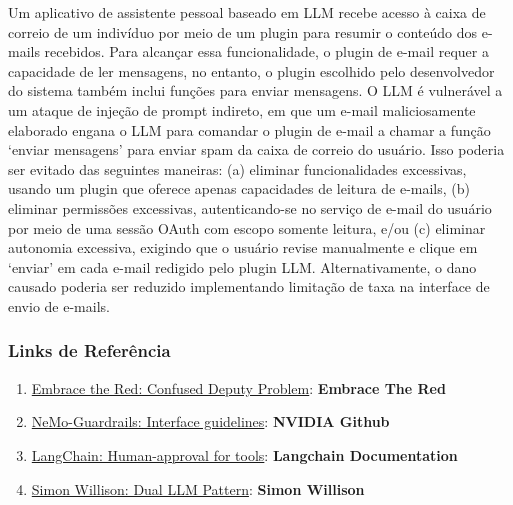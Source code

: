 \documentclass[
]{article}
\providecommand{\tightlist}{%
  \setlength{\itemsep}{0pt}\setlength{\parskip}{0pt}}
\begin{document}
Um aplicativo de assistente pessoal baseado em LLM recebe acesso à caixa
de correio de um indivíduo por meio de um plugin para resumir o conteúdo
dos e-mails recebidos. Para alcançar essa funcionalidade, o plugin de
e-mail requer a capacidade de ler mensagens, no entanto, o plugin
escolhido pelo desenvolvedor do sistema também inclui funções para
enviar mensagens. O LLM é vulnerável a um ataque de injeção de prompt
indireto, em que um e-mail maliciosamente elaborado engana o LLM para
comandar o plugin de e-mail a chamar a função `enviar mensagens' para
enviar spam da caixa de correio do usuário. Isso poderia ser evitado das
seguintes maneiras: (a) eliminar funcionalidades excessivas, usando um
plugin que oferece apenas capacidades de leitura de e-mails, (b)
eliminar permissões excessivas, autenticando-se no serviço de e-mail do
usuário por meio de uma sessão OAuth com escopo somente leitura, e/ou
(c) eliminar autonomia excessiva, exigindo que o usuário revise
manualmente e clique em `enviar' em cada e-mail redigido pelo plugin
LLM. Alternativamente, o dano causado poderia ser reduzido implementando
limitação de taxa na interface de envio de e-mails.

\subsubsection{Links de Referência}\label{links-de-referuxeancia}

\begin{enumerate}
\def\labelenumi{\arabic{enumi}.}
\tightlist
\item
  \href{https://embracethered.com/blog/posts/2023/chatgpt-cross-plugin-request-forgery-and-prompt-injection./}{Embrace
  the Red: Confused Deputy Problem}: \textbf{Embrace The Red}
\item
  \href{https://github.com/NVIDIA/NeMo-Guardrails/blob/main/docs/security/guidelines.md}{NeMo-Guardrails:
  Interface guidelines}: \textbf{NVIDIA Github}
\item
  \href{https://python.langchain.com/docs/modules/agents/tools/how_to/human_approval}{LangChain:
  Human-approval for tools}: \textbf{Langchain Documentation}
\item
  \href{https://simonwillison.net/2023/Apr/25/dual-llm-pattern/}{Simon
  Willison: Dual LLM Pattern}: \textbf{Simon Willison}
\end{enumerate}
\end{document}
